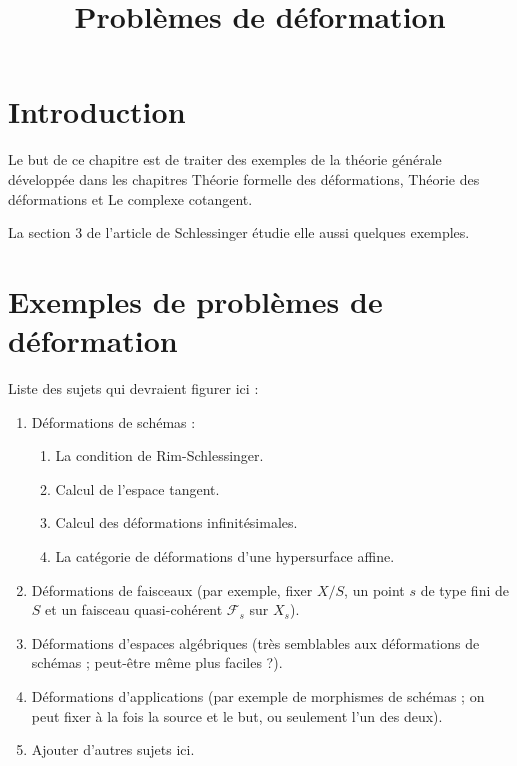

%


\title{Problèmes de déformation}

\maketitle

\label{section-phantom}

\tableofcontents

\section{Introduction}
\label{section-introduction}

\noindent
Le but de ce chapitre est de traiter des exemples de la théorie générale
développée dans les chapitres Théorie formelle des déformations,
Théorie des déformations et Le complexe cotangent.

\medskip\noindent
La section 3 de l'article \cite{Sch} de Schlessinger étudie elle aussi
quelques exemples.






\section{Exemples de problèmes de déformation}
\label{section-examples}

\noindent
Liste des sujets qui devraient figurer ici :
\begin{enumerate}
\item Déformations de schémas :
\begin{enumerate}
\item La condition de Rim-Schlessinger.
\item Calcul de l'espace tangent.
\item Calcul des déformations infinitésimales.
\item La catégorie de déformations d'une hypersurface affine.
\end{enumerate}
\item Déformations de faisceaux (par exemple, fixer $X/S$, un point $s$
de type fini de $S$ et un faisceau quasi-cohérent $\mathcal{F}_s$ sur $X_s$).
\item Déformations d'espaces algébriques (très semblables aux déformations
de schémas ; peut-être même plus faciles ?).
\item Déformations d'applications (par exemple de morphismes de schémas ; on peut fixer
à la fois la source et le but, ou seulement l'un des deux).
\item Ajouter d'autres sujets ici.
\end{enumerate}





